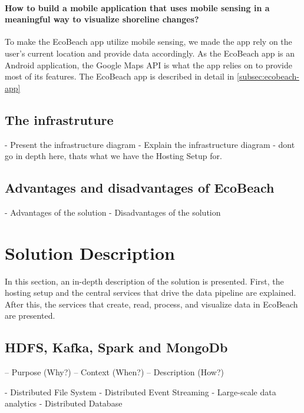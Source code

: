 \paragraph{How to build a mobile application that uses mobile sensing in a meaningful way to visualize shoreline changes?} To make the EcoBeach app utilize mobile sensing, we made the app rely on the user's current location and provide data accordingly. As the EcoBeach app is an Android application, the Google Maps API is what the app relies on to provide most of its features. The EcoBeach app is described in detail in \autoref{subsec:ecobeach-app}

\subsection{The infrastruture}\label{subsec:the-infrastructure}
- Present the infrastructure diagram
- Explain the infrastructure diagram
- dont go in depth here, thats what we have the Hosting Setup for.

\subsection{Advantages and disadvantages of EcoBeach}
- Advantages of the solution
- Disadvantages of the solution

\section{Solution Description}

In this section, an in-depth description of the solution is presented. First, the hosting setup and the central services that drive the data pipeline are explained. After this, the services that create, read, process, and visualize data in EcoBeach are presented.

\subsection{HDFS, Kafka, Spark and MongoDb} \label{subsec:the-stack}

– Purpose (Why?)
– Context (When?)
– Description (How?)

- Distributed File System
- Distributed Event Streaming
- Large-scale data analytics
- Distributed Database

